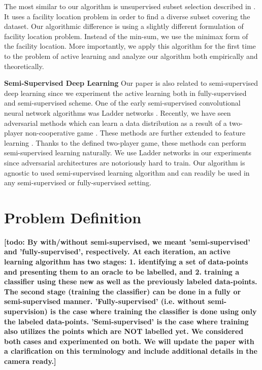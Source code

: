 \documentclass{article}
\newcommand{\todo}[1]{{\bf \color{red}[todo: #1]}}
\begin{document}
The most similar to our algorithm is unsupervised subset selection described in \cite{wei2013using}. It uses a facility location problem in order to find a diverse subset covering the dataset. Our algorithmic difference is using a slightly different formulation of facility location problem. Instead of the min-sum, we use the minimax \cite{facility} form of the facility location. More importantly, we apply this algorithm for the first time to the problem of active learning and analyze our algorithm both empirically and theoretically.

 
\noindent\textbf{Semi-Supervised Deep Learning}
Our paper is also related to semi-supervised deep learning since we experiment the active learning both in fully-supervised and semi-supervised scheme. 
One of the early semi-supervised convolutional neural network algorithms was Ladder networks \cite{ladder}. Recently, we have seen adversarial methods which can learn a data distribution as a result of a two-player non-cooperative game \cite{salimans2016improved,gan_original,dcgan}. These methods are further extended to feature learning \cite{ali, bigan}. Thanks to the defined two-player game, these methods can perform semi-supervised learning naturally. We use Ladder networks in our experiments since adversarial architectures are notoriously hard to train. Our algorithm is agnostic to used semi-supervised learning algorithm and can readily be used in any semi-supervised or fully-supervised setting.

\section{Problem Definition}
\todo{By with/without semi-supervised, we meant 'semi-supervised' and 'fully-supervised', respectively. At each iteration, an active learning algorithm has two stages: 1. identifying a set of data-points and presenting them to an oracle to be labelled, and 2. training a classifier using these new as well as the previously labeled data-points. The second stage (training the classifier) can be done in a fully or semi-supervised manner. 'Fully-supervised' (i.e. without semi-supervision) is the case where training the classifier is done using only the labeled data-points. 'Semi-supervised' is the case where training also utilizes the points which are NOT labelled yet. We considered both cases and experimented on both. We will update the paper with a clarification on this terminology and include additional details in the camera ready.}
\end{document}
